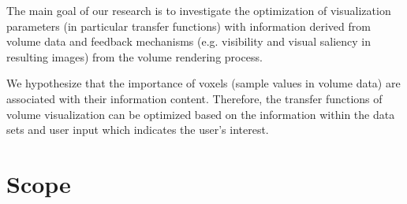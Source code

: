 
The main goal of our research is to investigate the optimization of visualization parameters (in particular transfer functions) with information derived from volume data and feedback mechanisms (e.g. visibility and visual saliency in resulting images) from the volume rendering process.

We hypothesize that the importance of voxels (sample values in volume data) are associated with their information content. Therefore, the transfer functions of volume visualization can be optimized based on the information within the data sets and user input which indicates the user's interest.


\section{Scope}

